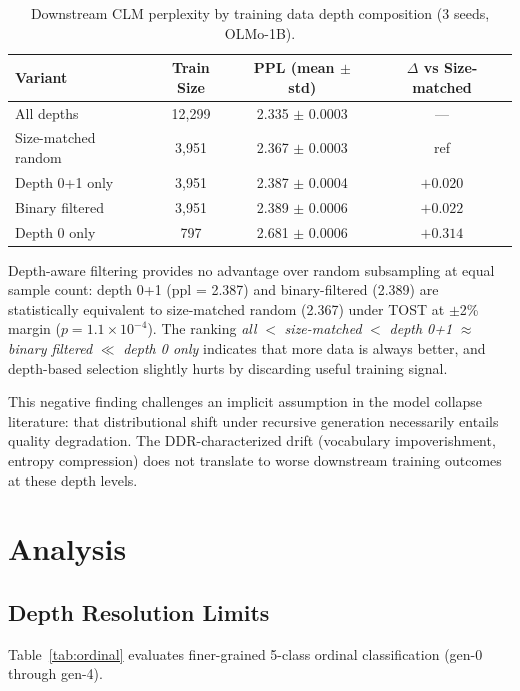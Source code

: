 \documentclass[11pt,a4paper]{article}
\begin{document}
\begin{table}[t]
\centering
\small
\caption{Downstream CLM perplexity by training data depth composition (3 seeds, OLMo-1B).}
\label{tab:downstream}
\begin{tabular}{lccc}
\toprule
Variant & Train Size & PPL (mean $\pm$ std) & $\Delta$ vs Size-matched \\
\midrule
All depths & 12,299 & 2.335 $\pm$ 0.0003 & --- \\
Size-matched random & 3,951 & 2.367 $\pm$ 0.0003 & ref \\
Depth 0+1 only & 3,951 & 2.387 $\pm$ 0.0004 & $+0.020$ \\
Binary filtered & 3,951 & 2.389 $\pm$ 0.0006 & $+0.022$ \\
Depth 0 only & 797 & 2.681 $\pm$ 0.0006 & $+0.314$ \\
\bottomrule
\end{tabular}
\end{table}

Depth-aware filtering provides no advantage over random subsampling at equal sample count: depth 0+1 (ppl = 2.387) and binary-filtered (2.389) are statistically equivalent to size-matched random (2.367) under TOST at $\pm$2\% margin ($p = 1.1 \times 10^{-4}$). The ranking \emph{all} $<$ \emph{size-matched} $<$ \emph{depth 0+1} $\approx$ \emph{binary filtered} $\ll$ \emph{depth 0 only} indicates that more data is always better, and depth-based selection slightly hurts by discarding useful training signal.

This negative finding challenges an implicit assumption in the model collapse literature: that distributional shift under recursive generation necessarily entails quality degradation. The DDR-characterized drift (vocabulary impoverishment, entropy compression) does not translate to worse downstream training outcomes at these depth levels.

\section{Analysis}

\subsection{Depth Resolution Limits}

Table~\ref{tab:ordinal} evaluates finer-grained 5-class ordinal classification (gen-0 through gen-4).
\end{document}
